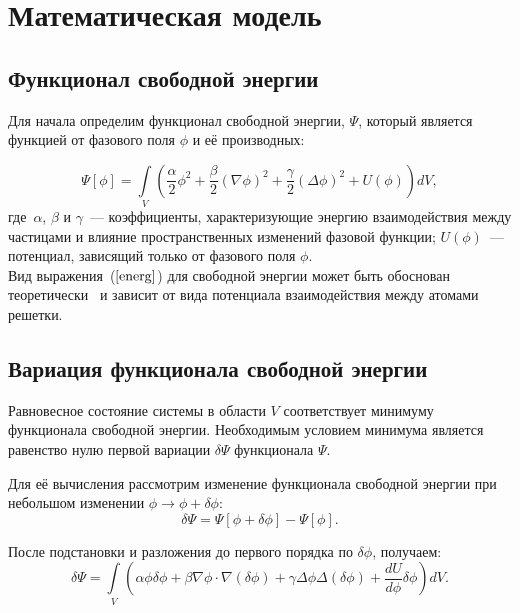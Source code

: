 %
%

\section{Математическая модель}


\subsection{Функционал свободной энергии}

Для начала определим функционал свободной энергии, $\Psi$, который является функцией от фазового поля $\phi$ и её производных:

\begin{equation} \label{energ}
\Psi[\phi] = \int\limits_V \left( \frac{\alpha}{2}\phi^2 + \frac{\beta}{2}(\nabla \phi)^2 + \frac{\gamma}{2}(\Delta \phi)^2 + U(\phi) \right) dV,
\end{equation}
где~$\alpha$, $\beta$ и $\gamma$~--- коэффициенты, характеризующие энергию взаимодействия между частицами и влияние пространственных изменений фазовой функции; $U(\phi)$~--- потенциал, зависящий только от фазового поля $\phi$. \\
Вид выражения~($\ref{energ}$) для свободной энергии может быть обоснован теоретически~\cite{chen_2002} и зависит от вида потенциала взаимодействия между атомами решетки. 

\subsection{Вариация функционала свободной энергии}

Равновесное состояние системы в области $V$ соответствует минимуму функционала свободной энергии. Необходимым условием минимума является равенство нулю первой вариации $\delta \Psi$ функционала $\Psi$.

Для её вычисления рассмотрим изменение функционала свободной энергии при небольшом изменении $\phi \rightarrow \phi + \delta \phi$:
\begin{equation*}
    \delta \Psi = \Psi[\phi + \delta \phi] - \Psi[\phi].
\end{equation*}


После подстановки и разложения до первого порядка по $\delta \phi$, получаем:
\begin{equation*}
    \delta \Psi = \int \limits_V \left( \alpha \phi \delta \phi + \beta \nabla \phi \cdot \nabla (\delta \phi) + \gamma \Delta \phi \Delta (\delta \phi) +  \frac{dU}{d\phi} \delta \phi \right) dV.
\end{equation*}

